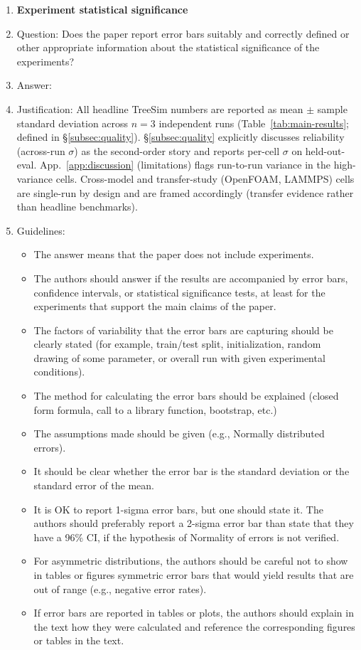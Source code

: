 \begin{enumerate}
\item {\bf Experiment statistical significance}
    \item[] Question: Does the paper report error bars suitably and correctly defined or other appropriate information about the statistical significance of the experiments?
    \item[] Answer: \answerYes{}
    \item[] Justification: All headline TreeSim numbers are reported as mean $\pm$ sample standard deviation across $n=3$ independent runs (Table~\ref{tab:main-results}; defined in \S\ref{subsec:quality}). \S\ref{subsec:quality} explicitly discusses reliability (across-run $\sigma$) as the second-order story and reports per-cell $\sigma$ on held-out-eval. App.~\ref{app:discussion} (limitations) flags run-to-run variance in the high-variance cells. Cross-model and transfer-study (OpenFOAM, LAMMPS) cells are single-run by design and are framed accordingly (transfer evidence rather than headline benchmarks).
    \item[] Guidelines:
    \begin{itemize}
        \item The answer \answerNA{} means that the paper does not include experiments.
        \item The authors should answer \answerYes{} if the results are accompanied by error bars, confidence intervals, or statistical significance tests, at least for the experiments that support the main claims of the paper.
        \item The factors of variability that the error bars are capturing should be clearly stated (for example, train/test split, initialization, random drawing of some parameter, or overall run with given experimental conditions).
        \item The method for calculating the error bars should be explained (closed form formula, call to a library function, bootstrap, etc.)
        \item The assumptions made should be given (e.g., Normally distributed errors).
        \item It should be clear whether the error bar is the standard deviation or the standard error of the mean.
        \item It is OK to report 1-sigma error bars, but one should state it. The authors should preferably report a 2-sigma error bar than state that they have a 96\% CI, if the hypothesis of Normality of errors is not verified.
        \item For asymmetric distributions, the authors should be careful not to show in tables or figures symmetric error bars that would yield results that are out of range (e.g., negative error rates).
        \item If error bars are reported in tables or plots, the authors should explain in the text how they were calculated and reference the corresponding figures or tables in the text.
    \end{itemize}


\end{enumerate}

